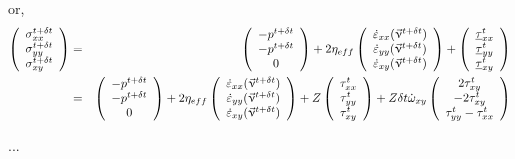 or, 
\begin{eqnarray}
\left(
\begin{array}{c}
{ \sigma}_{xx}^{t+\delta t}\\
{ \sigma}_{yy}^{t+\delta t}\\
{ \sigma}_{xy}^{t+\delta t}
\end{array}
\right)
&=&
\left(
\begin{array}{c}
-p^{t+\delta t} \\ 
-p^{t+\delta t} \\ 
0
\end{array}
\right)
+
2 \eta_{eff}
\left(
\begin{array}{c}
\dot{\varepsilon}_{xx}(\vec\upnu^{t+\delta t})\\
\dot{\varepsilon}_{yy}(\vec\upnu^{t+\delta t})\\
\dot{\varepsilon}_{xy}(\vec\upnu^{t+\delta t})
\end{array}
\right)
+
\left(
\begin{array}{c}
\underline{ \tau}_{xx}^t\\
\underline{ \tau}_{yy}^t\\
\underline{ \tau}_{xy}^t
\end{array}
\right) \nonumber\\
&=&
\left(
\begin{array}{c}
-p^{t+\delta t} \\ 
-p^{t+\delta t} \\ 
0
\end{array}
\right)
+
2 \eta_{eff}
\left(
\begin{array}{c}
\dot{\varepsilon}_{xx}(\vec\upnu^{t+\delta t})\\
\dot{\varepsilon}_{yy}(\vec\upnu^{t+\delta t})\\
\dot{\varepsilon}_{xy}(\vec\upnu^{t+\delta t})
\end{array}
\right)
+
Z
\left(
\begin{array}{c}
{\tau}_{xx}^t\\
{\tau}_{yy}^t\\
{\tau}_{xy}^t
\end{array}
\right)
+
Z \delta t \dot{\omega}_{xy}
\left(
\begin{array}{c}
 2\tau_{xy}^t \\
-2\tau_{xy}^t \\
\tau_{yy}^t-\tau_{xx}^t 
\end{array}
\right)
\end{eqnarray}



...


